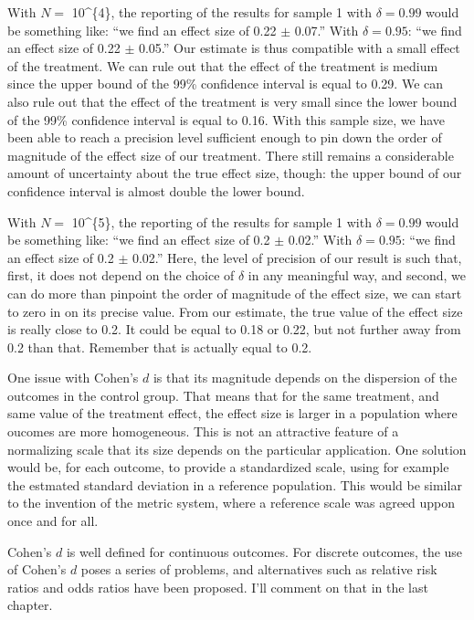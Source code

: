 \documentclass[]{book}
\theoremstyle{definition}
\theoremstyle{definition}
\theoremstyle{definition}
\theoremstyle{remark}
\let\BeginKnitrBlock\begin \let\EndKnitrBlock\end
\begin{document}
With \(N=\) 10\^{}\{4\}, the reporting of the results for sample 1 with
\(\delta=0.99\) would be something like: ``we find an effect size of
0.22 \(\pm\) 0.07.'' With \(\delta=0.95\): ``we find an effect size of
0.22 \(\pm\) 0.05.'' Our estimate is thus compatible with a small effect
of the treatment. We can rule out that the effect of the treatment is
medium since the upper bound of the 99\% confidence interval is equal to
0.29. We can also rule out that the effect of the treatment is very
small since the lower bound of the 99\% confidence interval is equal to
0.16. With this sample size, we have been able to reach a precision
level sufficient enough to pin down the order of magnitude of the effect
size of our treatment. There still remains a considerable amount of
uncertainty about the true effect size, though: the upper bound of our
confidence interval is almost double the lower bound.

With \(N=\) 10\^{}\{5\}, the reporting of the results for sample 1 with
\(\delta=0.99\) would be something like: ``we find an effect size of 0.2
\(\pm\) 0.02.'' With \(\delta=0.95\): ``we find an effect size of 0.2
\(\pm\) 0.02.'' Here, the level of precision of our result is such that,
first, it does not depend on the choice of \(\delta\) in any meaningful
way, and second, we can do more than pinpoint the order of magnitude of
the effect size, we can start to zero in on its precise value. From our
estimate, the true value of the effect size is really close to 0.2. It
could be equal to 0.18 or 0.22, but not further away from 0.2 than that.
Remember that is actually equal to 0.2.

\BeginKnitrBlock{remark}
\iffalse{} {Remark. } \fi{}One issue with Cohen's \(d\) is that its
magnitude depends on the dispersion of the outcomes in the control
group. That means that for the same treatment, and same value of the
treatment effect, the effect size is larger in a population where
oucomes are more homogeneous. This is not an attractive feature of a
normalizing scale that its size depends on the particular application.
One solution would be, for each outcome, to provide a standardized
scale, using for example the estmated standard deviation in a reference
population. This would be similar to the invention of the metric system,
where a reference scale was agreed uppon once and for all.
\EndKnitrBlock{remark}

\BeginKnitrBlock{remark}
\iffalse{} {Remark. } \fi{}Cohen's \(d\) is well defined for continuous
outcomes. For discrete outcomes, the use of Cohen's \(d\) poses a series
of problems, and alternatives such as relative risk ratios and odds
ratios have been proposed. I'll comment on that in the last chapter.
\EndKnitrBlock{remark}
\end{document}
